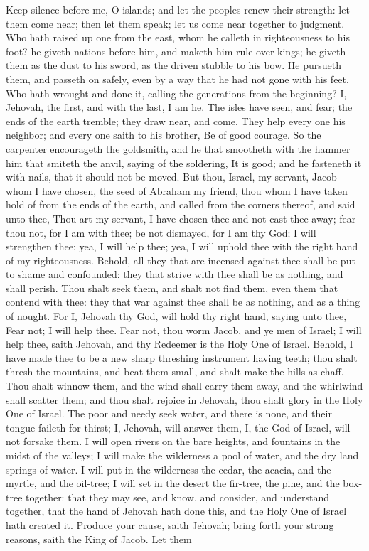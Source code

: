 Keep silence before me, O islands; and let the peoples renew their strength: let them come near; then let them speak; let us come near together to judgment. Who hath raised up one from the east, whom he calleth in righteousness to his foot? he giveth nations before him, and maketh him rule over kings; he giveth them as the dust to his sword, as the driven stubble to his bow. He pursueth them, and passeth on safely, even by a way that he had not gone with his feet. Who hath wrought and done it, calling the generations from the beginning? I, Jehovah, the first, and with the last, I am he. The isles have seen, and fear; the ends of the earth tremble; they draw near, and come. They help every one his neighbor; and every one saith to his brother, Be of good courage. So the carpenter encourageth the goldsmith, and he that smootheth with the hammer him that smiteth the anvil, saying of the soldering, It is good; and he fasteneth it with nails, that it should not be moved.  But thou, Israel, my servant, Jacob whom I have chosen, the seed of Abraham my friend, thou whom I have taken hold of from the ends of the earth, and called from the corners thereof, and said unto thee, Thou art my servant, I have chosen thee and not cast thee away; fear thou not, for I am with thee; be not dismayed, for I am thy God; I will strengthen thee; yea, I will help thee; yea, I will uphold thee with the right hand of my righteousness. Behold, all they that are incensed against thee shall be put to shame and confounded: they that strive with thee shall be as nothing, and shall perish. Thou shalt seek them, and shalt not find them, even them that contend with thee: they that war against thee shall be as nothing, and as a thing of nought. For I, Jehovah thy God, will hold thy right hand, saying unto thee, Fear not; I will help thee. Fear not, thou worm Jacob, and ye men of Israel; I will help thee, saith Jehovah, and thy Redeemer is the Holy One of Israel. Behold, I have made thee to be a new sharp threshing instrument having teeth; thou shalt thresh the mountains, and beat them small, and shalt make the hills as chaff. Thou shalt winnow them, and the wind shall carry them away, and the whirlwind shall scatter them; and thou shalt rejoice in Jehovah, thou shalt glory in the Holy One of Israel.  The poor and needy seek water, and there is none, and their tongue faileth for thirst; I, Jehovah, will answer them, I, the God of Israel, will not forsake them. I will open rivers on the bare heights, and fountains in the midst of the valleys; I will make the wilderness a pool of water, and the dry land springs of water. I will put in the wilderness the cedar, the acacia, and the myrtle, and the oil-tree; I will set in the desert the fir-tree, the pine, and the box-tree together: that they may see, and know, and consider, and understand together, that the hand of Jehovah hath done this, and the Holy One of Israel hath created it.  Produce your cause, saith Jehovah; bring forth your strong reasons, saith the King of Jacob. Let them 